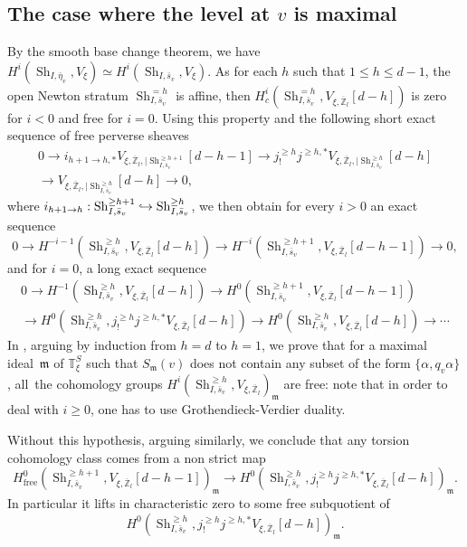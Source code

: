 \documentclass[JEP,XML,SOM,Unicode,published]{cedram}
\def\hto{\mathrel{\lhook\joinrel\to}}
\newcommand{\free}{\mathrm{free}}
\theoremstyle{plain}
\theoremstyle{definition}
\numberwithin{equation}{subsection}
\newcommand\Tm{{\mathbb T}}
\newcommand\Zm{{\mathbb Z}}
\DeclareMathOperator{\sh}{Sh}
\begin{document}
\subsection{The case where the level at $v$ is maximal}
\label{para-max}

By the smooth base change theorem, we have
$H^i(\sh_{I,\bar \eta_v}, V_\xi) \simeq H^i(\sh_{I,\bar s_v},V_\xi)$.
As for each $h$ such that $1 \leq h \leq d-1$, the open Newton stratum $\sh^{=h}_{I,\bar s_v}$ is affine,
then $H^i_c(\sh^{=h}_{I,\bar s_v},V_{\xi,\overline \Zm_l}[d-h])$ is zero for $i<0$ and free for $i=0$.
Using this property and the following short exact sequence
of free perverse sheaves
\begin{multline*}
0 \to i_{h+1 \to h,*} V_{\xi,\overline \Zm_l,|\sh_{I,\bar s_v}^{\geq h+1}}[d-h-1] \to
j^{\geq h}_! j^{\geq h,*} V_{\xi,\overline \Zm_l,|\sh^{\geq h}_{I,\bar s_v}}[d-h] \\ \to
V_{\xi,\overline \Zm_l,|\sh^{\geq h}_{I,\bar s_v}}[d-h] \to 0,
\end{multline*}
where $i_{h+1 \to h}: \sh_{I,\bar s_v}^{\geq h+1} \hto
\sh_{I,\bar s_v}^{\geq h}$,
we then obtain for every $i>0$ an exact sequence
\begin{equation} \label{eq-sec}
0 \to H^{-i-1}(\sh^{\geq h}_{I,\bar s_v},V_{\xi,\overline \Zm_l}[d-h]) \to
H^{-i}(\sh^{\geq h+1}_{I,\bar s_v},V_{\xi,\overline \Zm_l}[d-h-1]) \to 0,
\end{equation}
and for $i=0$, a long exact sequence
\begin{multline} \label{eq-sec0}
0 \to H^{-1}(\sh^{\geq h}_{I,\bar s_v},V_{\xi,\overline \Zm_l}[d-h]) \to
H^{0}(\sh^{\geq h+1}_{I,\bar s_v},V_{\xi,\overline \Zm_l}[d-h-1])\\
\to H^0(\sh^{\geq h}_{I,\bar s_v},j^{\geq h}_! j^{\geq h,*} V_{\xi,\overline \Zm_l}[d-h]) \to
H^{0}(\sh^{\geq h}_{I,\bar s_v},V_{\xi,\overline \Zm_l}[d-h]) \to \cdots
\end{multline}
In \cite{boyer-imj}, arguing by induction from $h=d$ to $h=1$, we prove that for a maximal
ideal~$\mathfrak m$ of $\Tm^S_{\xi}$ such that $S_{\mathfrak m}(v)$ does not contain any subset
of the form $\{\alpha,q_v \alpha\}$, all~the cohomology groups
$H^i(\sh_{I,\bar s_v}^{\geq h},V_{\xi,\overline \Zm_l})_{\mathfrak m}$ are free: note that in order
to deal with $i\geq 0$, one has to use Grothendieck-Verdier duality.

Without this hypothesis, arguing similarly, we conclude that any torsion cohomology class
comes from a non strict map
\begin{equation} \label{eq-map-strict-fini}
H^{0}_{\free}(\sh^{\geq h+1}_{I,\bar s_v},V_{\xi,\overline \Zm_l}[d-h-1])_{\mathfrak m} \to
H^0(\sh^{\geq h}_{I,\bar s_v},j^{\geq h}_! j^{\geq h,*} V_{\xi,\overline \Zm_l}[d-h])_{\mathfrak m}.
\end{equation}
In particular it lifts in characteristic zero to some free subquotient of
\[
H^0(\sh^{\geq h}_{I,\bar s_v},j^{\geq h}_! j^{\geq h,*} V_{\xi,\overline \Zm_l}[d-h])_{\mathfrak m}.
\]
\end{document}
